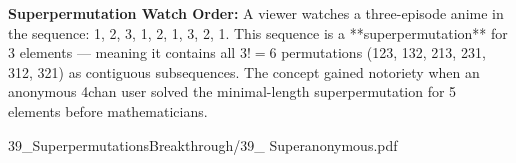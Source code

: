 \begin{SideNotePage}{
    \textbf{Superpermutation Watch Order:}  
    A viewer watches a three-episode anime in the sequence: 1, 2, 3, 1, 2, 1, 3, 2, 1. This sequence is a **superpermutation** for 3 elements — meaning it contains all $3! = 6$ permutations (123, 132, 213, 231, 312, 321) as contiguous subsequences. The concept gained notoriety when an anonymous 4chan user solved the minimal-length superpermutation for 5 elements before mathematicians. \par
  }{39_SuperpermutationsBreakthrough/39_ Superanonymous.pdf}
\end{SideNotePage}
